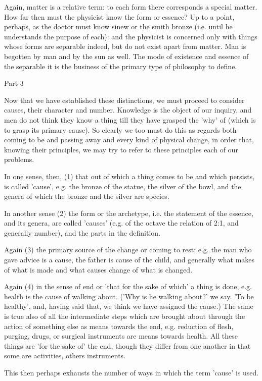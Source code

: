 Again, matter is a relative term: to each form there corresponds a
special matter. How far then must the physicist know the form or essence?
Up to a point, perhaps, as the doctor must know sinew or the smith
bronze (i.e. until he understands the purpose of each): and the physicist
is concerned only with things whose forms are separable indeed, but
do not exist apart from matter. Man is begotten by man and by the
sun as well. The mode of existence and essence of the separable it
is the business of the primary type of philosophy to define.

Part 3

Now that we have established these distinctions, we must proceed to
consider causes, their character and number. Knowledge is the object
of our inquiry, and men do not think they know a thing till they have
grasped the 'why' of (which is to grasp its primary cause). So clearly
we too must do this as regards both coming to be and passing away
and every kind of physical change, in order that, knowing their principles,
we may try to refer to these principles each of our problems.

In one sense, then, (1) that out of which a thing comes to be and
which persists, is called 'cause', e.g. the bronze of the statue,
the silver of the bowl, and the genera of which the bronze and the
silver are species. 

In another sense (2) the form or the archetype, i.e. the statement
of the essence, and its genera, are called 'causes' (e.g. of the octave
the relation of 2:1, and generally number), and the parts in the definition.

Again (3) the primary source of the change or coming to rest; e.g.
the man who gave advice is a cause, the father is cause of the child,
and generally what makes of what is made and what causes change of
what is changed. 

Again (4) in the sense of end or 'that for the sake of which' a thing
is done, e.g. health is the cause of walking about. ('Why is he walking
about?' we say. 'To be healthy', and, having said that, we think we
have assigned the cause.) The same is true also of all the intermediate
steps which are brought about through the action of something else
as means towards the end, e.g. reduction of flesh, purging, drugs,
or surgical instruments are means towards health. All these things
are 'for the sake of' the end, though they differ from one another
in that some are activities, others instruments. 

This then perhaps exhausts the number of ways in which the term 'cause'
is used. 

